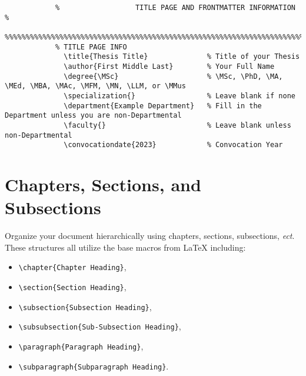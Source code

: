 			\begin{lstlisting}[float=h,caption=Example of How to Set Title Page Info,label=lst:TitlePage,style=LaTeXStyle,basicstyle=\scriptsize\ttfamily,]
			%%%%%%%%%%%%%%%%%%%%%%%%%%%%%%%%%%%%%%%%%%%%%%%%%%%%%%%%%%%%%%%%%%%%%%%%%%%%%%%%
			%                  TITLE PAGE AND FRONTMATTER INFORMATION                      %
			%%%%%%%%%%%%%%%%%%%%%%%%%%%%%%%%%%%%%%%%%%%%%%%%%%%%%%%%%%%%%%%%%%%%%%%%%%%%%%%%
			% TITLE PAGE INFO
			  \title{Thesis Title}              % Title of your Thesis
			  \author{First Middle Last}        % Your Full Name
			  \degree{\MSc}                     % \MSc, \PhD, \MA, \MEd, \MBA, \MAc, \MFM, \MN, \LLM, or \MMus
			  \specialization{}                 % Leave blank if none
			  \department{Example Department}   % Fill in the Department unless you are non-Departmental
			  \faculty{}                        % Leave blank unless non-Departmental
			  \convocationdate{2023}            % Convocation Year
			\end{lstlisting}

	\section{Chapters, Sections, and Subsections}
		Organize your document hierarchically using chapters, sections, subsections, \textit{ect}.
		These structures all utilize the base macros from \LaTeX{} including:
			\begin{itemize}
				\item \lstinline|\chapter{Chapter Heading}|, 
				\item \lstinline|\section{Section Heading}|, 
				\item \lstinline|\subsection{Subsection Heading}|, 
				\item \lstinline|\subsubsection{Sub-Subsection Heading}|, 
				\item \lstinline|\paragraph{Paragraph Heading}|, 
				\item \lstinline|\subparagraph{Subparagraph Heading}|. 
			\end{itemize}


